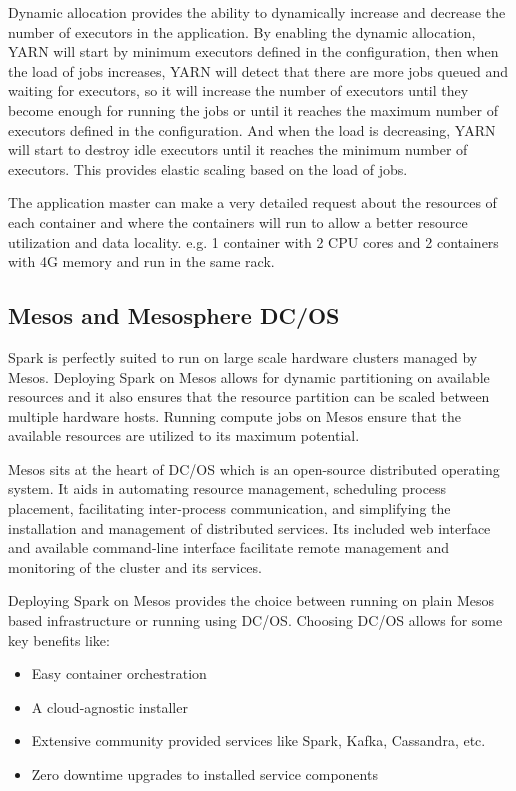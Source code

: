 \documentclass[a4paper, 10 pt, conference]{IEEEtran}
\begin{document}
Dynamic allocation provides the ability to dynamically increase and decrease the number of executors in the application. By enabling the dynamic allocation, YARN will start by minimum executors defined in the configuration, then when the load of jobs increases, YARN will detect that there are more jobs queued and waiting for executors, so it will increase the number of executors until they become enough for running the jobs or until it reaches the maximum number of executors defined in the configuration. And when the load is decreasing, YARN will start to destroy idle executors until it reaches the minimum number of executors. This provides elastic scaling based on the load of jobs.

The application master can make a very detailed request about the resources of each container and where the containers will run to allow a better resource utilization and data locality. e.g. 1 container with 2 CPU cores and 2 containers with 4G memory and run in the same rack.

\subsection{Mesos and Mesosphere DC/OS}
Spark is perfectly suited to run on large scale hardware clusters managed by Mesos. Deploying Spark on Mesos allows for dynamic partitioning on available resources and it also ensures that the resource partition can be scaled between multiple hardware hosts. Running compute jobs on Mesos ensure that the available resources are utilized to its maximum potential.

Mesos sits at the heart of DC/OS which is an open-source distributed operating system. It aids in automating resource management, scheduling process placement, facilitating inter-process communication, and simplifying the installation and management of distributed services. Its included web interface and available command-line interface facilitate remote management and monitoring of the cluster and its services.

Deploying Spark on Mesos provides the choice between running on plain Mesos based infrastructure or running using DC/OS. Choosing DC/OS allows for some key benefits like:

\begin{itemize}
  \item Easy container orchestration
  \item A cloud-agnostic installer
  \item Extensive community provided services like Spark, Kafka, Cassandra, etc.
  \item Zero downtime upgrades to installed service components
\end{itemize}
\end{document}
